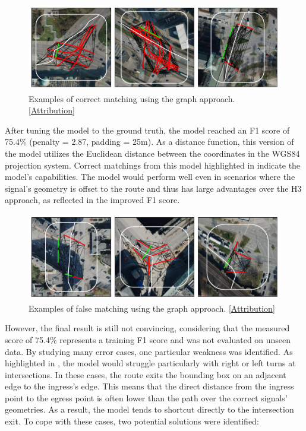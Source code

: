 \begin{figure}[t]
\centering
\includegraphics[width=\linewidth]{images/matching-dijkstra-correct.pdf}
\caption{Examples of correct matching using the graph approach. [\hyperref[attribution]{Attribution}]}
\label{fig:sg-selection-graph-example}
\end{figure}

After tuning the model to the ground truth, the model reached an F1 score of 75.4\% (penalty = 2.87, padding = 25m). As a distance function, this version of the model utilizes the Euclidean distance between the coordinates in the WGS84 projection system. Correct matchings from this model highlighted in  indicate the model's capabilities. The model would perform well even in scenarios where the signal's geometry is offset to the route and thus has large advantages over the H3 approach, as reflected in the improved F1 score.

\begin{figure}[t]
\centering
\includegraphics[width=\linewidth]{images/matching-dijkstra-incorrect.pdf}
\caption{Examples of false matching using the graph approach. [\hyperref[attribution]{Attribution}]}
\label{fig:sg-selection-graph-fails}
\end{figure}

However, the final result is still not convincing, considering that the measured score of 75.4\% represents a training F1 score and was not evaluated on unseen data. By studying many error cases, one particular weakness was identified. As highlighted in , the model would struggle particularly with right or left turns at intersections. In these cases, the route exits the bounding box on an adjacent edge to the ingress's edge. This means that the direct distance from the ingress point to the egress point is often lower than the path over the correct signals' geometries. As a result, the model tends to shortcut directly to the intersection exit. To cope with these cases, two potential solutions were identified:

